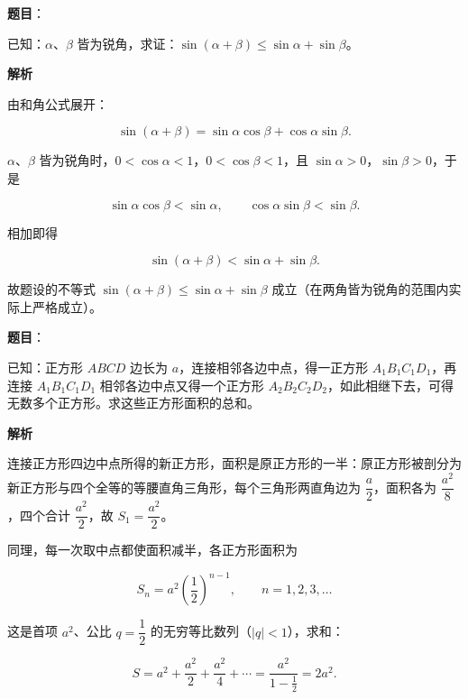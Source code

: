 \begin{answer}

\textbf{题目}：

已知：$\alpha$、$\beta$ 皆为锐角，求证：$\sin(\alpha+\beta)\le\sin\alpha+\sin\beta$。

\textbf{解析}

由和角公式展开：

\nopagebreak[4]
\[
\sin(\alpha+\beta)=\sin\alpha\cos\beta+\cos\alpha\sin\beta.
\]

$\alpha$、$\beta$ 皆为锐角时，$0<\cos\alpha<1$，$0<\cos\beta<1$，且 $\sin\alpha>0$，$\sin\beta>0$，于是

\nopagebreak[4]
\[
\sin\alpha\cos\beta<\sin\alpha,\qquad
\cos\alpha\sin\beta<\sin\beta.
\]

相加即得

\nopagebreak[4]
\[
\sin(\alpha+\beta)<\sin\alpha+\sin\beta.
\]

故题设的不等式 $\sin(\alpha+\beta)\le\sin\alpha+\sin\beta$ 成立（在两角皆为锐角的范围内实际上严格成立）。


\end{answer}
\begin{answer}

\textbf{题目}：

已知：正方形 $ABCD$ 边长为 $a$，连接相邻各边中点，得一正方形 $A_{1}B_{1}C_{1}D_{1}$，再连接 $A_{1}B_{1}C_{1}D_{1}$ 相邻各边中点又得一个正方形 $A_{2}B_{2}C_{2}D_{2}$，如此相继下去，可得无数多个正方形。求这些正方形面积的总和。

\textbf{解析}

连接正方形四边中点所得的新正方形，面积是原正方形的一半：原正方形被剖分为新正方形与四个全等的等腰直角三角形，每个三角形两直角边为 $\dfrac{a}{2}$，面积各为 $\dfrac{a^{2}}{8}$，四个合计 $\dfrac{a^{2}}{2}$，故 $S_{1}=\dfrac{a^{2}}{2}$。

同理，每一次取中点都使面积减半，各正方形面积为

\nopagebreak[4]
\[
S_{n}=a^{2}\left(\frac{1}{2}\right)^{n-1},\qquad n=1,2,3,\dots
\]

这是首项 $a^{2}$、公比 $q=\dfrac12$ 的无穷等比数列（$|q|<1$），求和：

\nopagebreak[4]
\[
S=a^{2}+\frac{a^{2}}{2}+\frac{a^{2}}{4}+\cdots=\frac{a^{2}}{1-\frac12}=2a^{2}.
\]


\end{answer}
